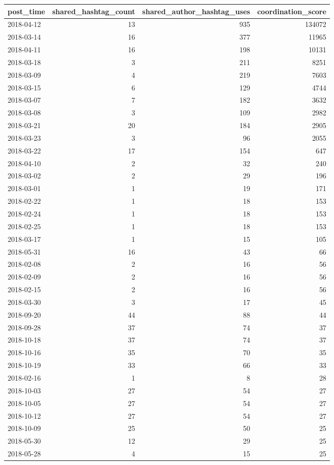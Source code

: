 \begin{tabular}{lrrr}
\toprule
post\_time & shared\_hashtag\_count & shared\_author\_hashtag\_uses & coordination\_score \\
\midrule
2018-04-12 & 13 & 935 & 134072 \\
2018-03-14 & 16 & 377 & 11965 \\
2018-04-11 & 16 & 198 & 10131 \\
2018-03-18 & 3 & 211 & 8251 \\
2018-03-09 & 4 & 219 & 7603 \\
2018-03-15 & 6 & 129 & 4744 \\
2018-03-07 & 7 & 182 & 3632 \\
2018-03-08 & 3 & 109 & 2982 \\
2018-03-21 & 20 & 184 & 2905 \\
2018-03-23 & 3 & 96 & 2055 \\
2018-03-22 & 17 & 154 & 647 \\
2018-04-10 & 2 & 32 & 240 \\
2018-03-02 & 2 & 29 & 196 \\
2018-03-01 & 1 & 19 & 171 \\
2018-02-22 & 1 & 18 & 153 \\
2018-02-24 & 1 & 18 & 153 \\
2018-02-25 & 1 & 18 & 153 \\
2018-03-17 & 1 & 15 & 105 \\
2018-05-31 & 16 & 43 & 66 \\
2018-02-08 & 2 & 16 & 56 \\
2018-02-09 & 2 & 16 & 56 \\
2018-02-15 & 2 & 16 & 56 \\
2018-03-30 & 3 & 17 & 45 \\
2018-09-20 & 44 & 88 & 44 \\
2018-09-28 & 37 & 74 & 37 \\
2018-10-18 & 37 & 74 & 37 \\
2018-10-16 & 35 & 70 & 35 \\
2018-10-19 & 33 & 66 & 33 \\
2018-02-16 & 1 & 8 & 28 \\
2018-10-03 & 27 & 54 & 27 \\
2018-10-05 & 27 & 54 & 27 \\
2018-10-12 & 27 & 54 & 27 \\
2018-10-09 & 25 & 50 & 25 \\
2018-05-30 & 12 & 29 & 25 \\
2018-05-28 & 4 & 15 & 25 \\

\end{tabular}
